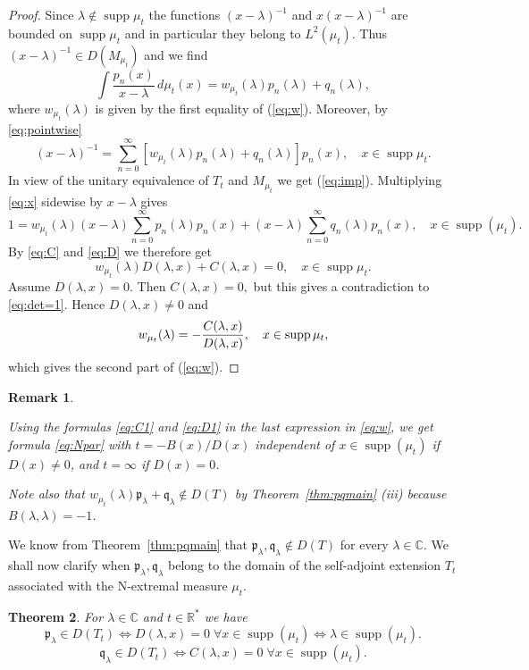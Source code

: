 \documentclass [12pt]{article}
\newtheorem{thm}{Theorem}[section]
\newtheorem{rem}[thm]{Remark}
\DeclareMathOperator{\supp}{supp}
\newcommand{\C}{\mathbb{C}}
\newcommand{\R}{\mathbb{R}}
\newcommand{\la}{\lambda}
\begin{document}
\begin{proof} Since $\lambda \notin \supp\mu_t$ 
the functions $(x-\lambda)^{-1}$ and $x(x-\lambda)^{-1}$ are bounded on $\supp\mu_t$ and in particular they belong to $L^2(\mu_t)$. Thus $(x-\lambda)^{-1}\in D(M_{\mu_t})$ and we find
$$
\int \frac{p_n(x)}{x-\lambda}\,d\mu_t(x)=w_{\mu_t}(\lambda)p_n(\lambda)+q_n(\lambda),
$$ 
where $w_{\mu_t}(\lambda)$ is given by the first equality of  (\ref{eq:w}). 
Moreover, by \eqref{eq:pointwise}
\begin{equation}\label{eq:x}(x-\lambda)^{-1}=\sum_{n=0}^\infty [w_{\mu_t}(\lambda)p_n(\lambda)+q_n(\lambda)]p_n(x), \quad x\in \supp\mu_t.
\end{equation}
In view of the unitary equivalence of $T_t$ and $M_{\mu_t}$ we get (\ref{eq:imp}).
Multiplying \eqref{eq:x} sidewise by $x-\lambda$ gives 
$$
1=w_{\mu_t}(\lambda)(x-\lambda)\sum_{n=0}^\infty p_n(\lambda)p_n(x)+(x-\lambda) \sum_{n=0}^\infty q_n(\lambda)p_n(x),\quad x\in\supp(\mu_t).
$$
By \eqref{eq:C} and \eqref{eq:D} we therefore get
$$
w_{\mu_t}(\lambda)D(\lambda,x)+C(\lambda,x)=0,\quad x\in \supp\mu_t.
$$
Assume $D(\lambda,x)=0.$ Then $C(\lambda,x)=0,$ but this gives a contradiction to \eqref{eq:det=1}. 
Hence $D(\lambda,x)\neq 0$ and 
$$
w_{\mu_t}(\lambda)=-{C(\lambda, x)\over D(\lambda,x)},\quad x\in \supp\mu_t,
$$
which gives the second part of (\ref{eq:w}).
\end{proof}

\begin{rem}\label{thm:alt} {\rm Using the formulas \eqref{eq:C1} and \eqref{eq:D1} in the last expression in \eqref{eq:w}, we get formula \eqref{eq:Npar} with 
$t=-B(x)/D(x)$ independent of $x\in\supp(\mu_t)$ if $D(x)\neq 0$, and $t=\infty$ if $D(x)=0$.

Note also that $w_{\mu_t}(\lambda)\mathfrak{p}_\lambda+\mathfrak{q}_\lambda \notin D(T)$ by Theorem~\ref{thm:pqmain} (iii) because $B(\la,\la)=-1$.
}
\end{rem}

We know from Theorem~\ref{thm:pqmain} that $\mathfrak{p}_\la, \mathfrak{q}_\la\notin D(T)$ for every $\la\in\C$. We shall now clarify when  $\mathfrak{p}_\la, \mathfrak{q}_\la$  belong to the domain of the self-adjoint extension $T_t$ associated with the N-extremal measure $\mu_t$.
 
\begin{thm}\label{thm:D(T_t)} For $\la\in\C$ and $t\in\R^*$ we have
\begin{equation}\label{eq:pD(T_t)}
\mathfrak{p}_\la\in D(T_t) \iff D(\la,x)=0 \;\forall x\in\supp(\mu_t)\iff \la\in\supp(\mu_t).
\end{equation}
\begin{equation}\label{eq:qD(T_t)}
\mathfrak{q}_\la\in D(T_t) \iff C(\la,x)=0 \;\forall x\in\supp(\mu_t).
\end{equation}
\end{thm}
\end{document}
